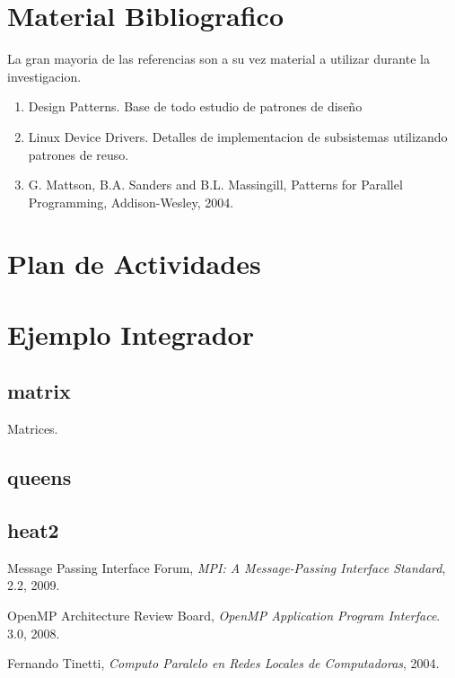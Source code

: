 \documentclass[a4paper,twocolumn]{article}
\begin{document}
\section{Material Bibliografico}

La gran mayoria de las referencias son a su vez material a utilizar durante la investigacion.

\begin{enumerate}
\item{Design Patterns}. Base de todo estudio de patrones de dise\~no
\item{Linux Device Drivers}. Detalles de implementacion de subsistemas utilizando patrones de reuso.
\item{G. Mattson, B.A. Sanders and B.L. Massingill, Patterns for Parallel Programming, Addison-Wesley, 2004}.
\end{enumerate}

\section{Plan de Actividades}

\appendix

\section{Ejemplo Integrador}

\subsection{matrix}

Matrices.

\subsection{queens}

\subsection{heat2}

\begin{thebibliography}{9}
 
  Message Passing Interface Forum,
  \emph{MPI: A Message-Passing Interface Standard},
  2.2,
  2009.

  OpenMP Architecture Review Board,
  \emph{OpenMP Application Program Interface}.
  3.0,
  2008.

  Fernando Tinetti,
  \emph{Computo Paralelo en Redes Locales de Computadoras},
  2004.

\end{thebibliography}
\end{document}
